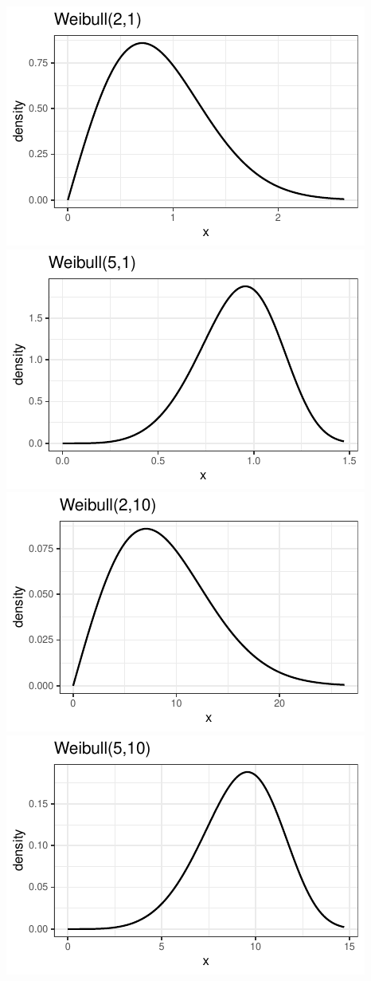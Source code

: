 \documentclass[twoside]{book}\usepackage[]{graphicx}\usepackage[]{xcolor}
\makeatletter
\def\maxwidth{ %
  \ifdim\Gin@nat@width>\linewidth
    \linewidth
  \else
    \Gin@nat@width
  \fi
}
\newenvironment{knitrout}{}{} %
\makeatother
\begin{document}
\begin{knitrout}
{\centering \includegraphics[width=\maxwidth]{figures/fig-unnamed-chunk-81-1} 
\includegraphics[width=\maxwidth]{figures/fig-unnamed-chunk-81-2} 
\includegraphics[width=\maxwidth]{figures/fig-unnamed-chunk-81-3} 
\includegraphics[width=\maxwidth]{figures/fig-unnamed-chunk-81-4} 

}
\end{knitrout}
\end{document}
